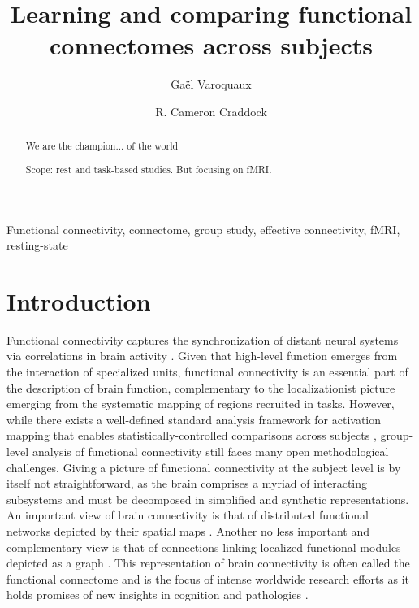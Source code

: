 \documentclass[5p]{elsarticle}
\begin{document}
\title{Learning and comparing functional connectomes across subjects}


\author[parietal,unicog,cea]{Ga\"el Varoquaux}
\author[cmi,nki]{R. Cameron Craddock}


\address[parietal]{Parietal project-team, INRIA Saclay-\^ile de France}
\address[unicog]{INSERM, U992}
\address[cea]{CEA/Neurospin b\^at 145, 91191 Gif-Sur-Yvette}
\address[cmi]{Child Mind Institute, New York, New York}
\address[nki]{Nathan Kline Institute for Psychiatric Research, Orangeburg, New York}

\begin{abstract}
    We are the champion... of the world

    Scope: rest and task-based studies. But focusing on fMRI.
\end{abstract}

\begin{keyword}
    Functional connectivity, connectome, group study, effective
    connectivity, fMRI, resting-state
\end{keyword}

\maketitle

\sloppy %

\section{Introduction}

Functional connectivity captures the synchronization of distant
neural systems via correlations in brain activity
\cite{biswal1995,cordes2000}. Given that high-level
function emerges from the interaction of specialized units, functional
connectivity is an essential part of the description of brain function,
complementary to the localizationist picture emerging from the systematic
mapping of regions recruited in tasks. However, while there exists a
well-defined standard analysis framework for activation mapping that enables
statistically-controlled comparisons across subjects \cite{friston1995},
group-level analysis of functional connectivity still faces many open
methodological challenges. Giving a picture of functional connectivity at
the subject level is by itself not straightforward, as the brain
comprises a myriad of interacting subsystems and must be decomposed in
simplified and synthetic representations. An important view of brain
connectivity is that of distributed functional networks depicted by their
spatial maps \cite{fox2005}. Another no less important and complementary
view is that of connections linking localized functional modules depicted
as a graph \cite{bullmore2009}. This representation of brain connectivity
is often called the functional connectome \cite{sporns2005} and is the
focus of intense worldwide research efforts as it holds promises of new
insights in cognition and pathologies
\cite{greicius2008b,biswal2010,fox2010}.
\end{document}
